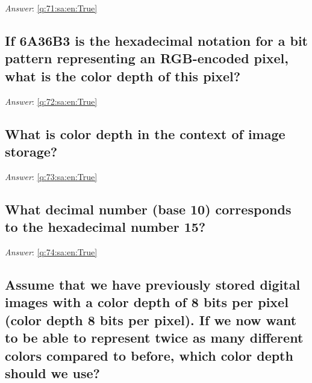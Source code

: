 \documentclass[a4paper,11pt,oneside]{article}
\begin{document}
\begin{sloppypar}
\noindent\makebox[\textwidth]{\hrulefill}

\vspace{1cm}

\textit{Answer}: \autoref{q:71:sa:en:True}



\subsection{If 6A36B3 is the hexadecimal notation for a bit pattern representing an RGB-encoded pixel, what is the color depth of this pixel?}

\label{q:72:sa:en:False}

\vspace{2cm}

\noindent\makebox[\textwidth]{\hrulefill}

\vspace{1cm}

\textit{Answer}: \autoref{q:72:sa:en:True}



\subsection{What is color depth in the context of image storage?}

\label{q:73:sa:en:False}

\vspace{2cm}

\noindent\makebox[\textwidth]{\hrulefill}

\vspace{1cm}

\textit{Answer}: \autoref{q:73:sa:en:True}



\subsection{What decimal number (base 10) corresponds to the hexadecimal number 15?}

\label{q:74:sa:en:False}

\vspace{2cm}

\noindent\makebox[\textwidth]{\hrulefill}

\vspace{1cm}

\textit{Answer}: \autoref{q:74:sa:en:True}



\subsection{Assume that we have previously stored digital images with a color depth of 8 bits per pixel (color depth 8 bits per pixel). If we now want to be able to represent twice as many different colors compared to before, which color depth should we use?}


\end{sloppypar}
\end{document}
